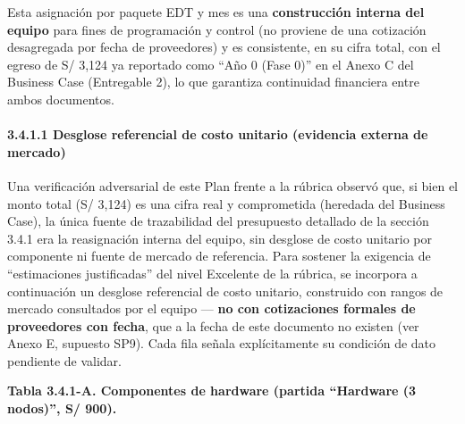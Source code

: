 \documentclass[11pt,a4paper]{article}
\begin{document}
Esta asignación por paquete EDT y mes es una \textbf{construcción interna del equipo} para fines de programación y control (no proviene de una cotización desagregada por fecha de proveedores) y es consistente, en su cifra total, con el egreso de S/ 3,124 ya reportado como ``Año 0 (Fase 0)'' en el Anexo C del Business Case (Entregable 2), lo que garantiza continuidad financiera entre ambos documentos.

\paragraph{3.4.1.1 Desglose referencial de costo unitario (evidencia externa de mercado)}\label{desglose-referencial-de-costo-unitario-evidencia-externa-de-mercado}

Una verificación adversarial de este Plan frente a la rúbrica observó que, si bien el monto total (S/ 3,124) es una cifra real y comprometida (heredada del Business Case), la única fuente de trazabilidad del presupuesto detallado de la sección 3.4.1 era la reasignación interna del equipo, sin desglose de costo unitario por componente ni fuente de mercado de referencia. Para sostener la exigencia de ``estimaciones justificadas'' del nivel Excelente de la rúbrica, se incorpora a continuación un desglose referencial de costo unitario, construido con rangos de mercado consultados por el equipo --- \textbf{no con cotizaciones formales de proveedores con fecha}, que a la fecha de este documento no existen (ver Anexo E, supuesto SP9). Cada fila señala explícitamente su condición de dato pendiente de validar.

\textbf{Tabla 3.4.1-A. Componentes de hardware (partida ``Hardware (3 nodos)'', S/ 900).}
\end{document}
